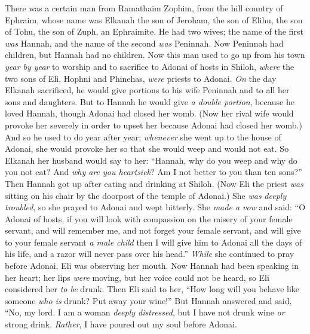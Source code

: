 
\begin{biblechapter} %
 There was a certain man from Ramathaim Zophim, from the hill country of Ephraim, whose name was Elkanah the son of Jeroham, the son of Elihu, the son of Tohu, the son of Zuph, an Ephraimite.
\verse He had two wives; the name of the first \textit{was} Hannah, and the name of the second \textit{was} Peninnah. Now Peninnah had children, but Hannah had no children.
\verse Now this man used to go up from his town \textit{year by year} to worship and to sacrifice to Adonai of hosts in Shiloh, \textit{where} the two sons of Eli, Hophni and Phinehas, \textit{were} priests to Adonai.
\verse \textit{On} the day Elkanah sacrificed, he would give portions to his wife Peninnah and to all her sons and daughters.
\verse But to Hannah he would give \textit{a double portion}, because he loved Hannah, though Adonai had closed her womb.
\verse (Now her rival wife would provoke her severely in order to upset her because Adonai had closed her womb.)
\verse And so he used to do year after year; \textit{whenever} she went up to the house of Adonai, she would provoke her so that she would weep and would not eat.
\verse So Elkanah her husband would say to her: “Hannah, why do you weep and why do you not eat? And \textit{why are you heartsick}? Am I not better to you than ten sons?”
\verse Then Hannah got up after eating and drinking at Shiloh. (Now Eli the priest \textit{was} sitting on his chair by the doorpost of the temple of Adonai.)
\verse She \textit{was} \textit{deeply troubled}, so she prayed to Adonai and wept bitterly.
\verse She \textit{made a vow} and said: “O Adonai of hosts, if you will look with compassion on the misery of your female servant, and will remember me, and not forget your female servant, and will give to your female servant \textit{a male child} then I will give him to Adonai all the days of his life, and a razor will never pass over his head.”
\verse \textit{While} she continued to pray before Adonai, Eli was observing her mouth.
\verse Now Hannah had been speaking in her heart; her lips \textit{were} moving, but her voice could not be heard, so Eli considered her \textit{to be} drunk.
\verse Then Eli said to her, “How long will you behave like someone \textit{who is} drunk? Put away your wine!”
\verse But Hannah answered and said, “No, my lord. I am a woman \textit{deeply distressed}, but I have not drunk wine \textit{or} strong drink. \textit{Rather}, I have poured out my soul before Adonai.

\end{biblechapter}
